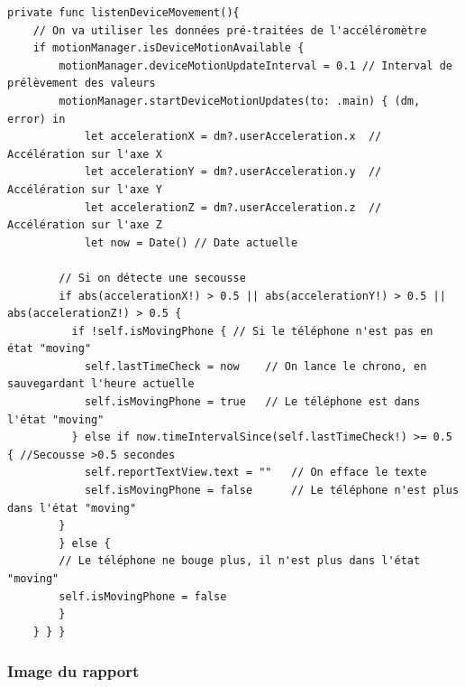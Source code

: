 \documentclass{article}
\begin{document}
\begin{verbatim}
private func listenDeviceMovement(){
    // On va utiliser les données pré-traitées de l'accéléromètre
    if motionManager.isDeviceMotionAvailable {
        motionManager.deviceMotionUpdateInterval = 0.1 // Interval de prélèvement des valeurs
        motionManager.startDeviceMotionUpdates(to: .main) { (dm, error) in
            let accelerationX = dm?.userAcceleration.x  // Accélération sur l'axe X
            let accelerationY = dm?.userAcceleration.y  // Accélération sur l'axe Y
            let accelerationZ = dm?.userAcceleration.z  // Accélération sur l'axe Z
            let now = Date() // Date actuelle

        // Si on détecte une secousse
        if abs(accelerationX!) > 0.5 || abs(accelerationY!) > 0.5 || abs(accelerationZ!) > 0.5 {
          if !self.isMovingPhone { // Si le téléphone n'est pas en état "moving"
          	self.lastTimeCheck = now    // On lance le chrono, en sauvegardant l'heure actuelle
          	self.isMovingPhone = true   // Le téléphone est dans l'état "moving"
          } else if now.timeIntervalSince(self.lastTimeCheck!) >= 0.5 { //Secousse >0.5 secondes
          	self.reportTextView.text = ""   // On efface le texte
          	self.isMovingPhone = false      // Le téléphone n'est plus dans l'état "moving"
        }
        } else {
        // Le téléphone ne bouge plus, il n'est plus dans l'état "moving"
        self.isMovingPhone = false
        }
    } } }
\end{verbatim}

\newpage

\subsubsection{Image du rapport}
\end{document}
